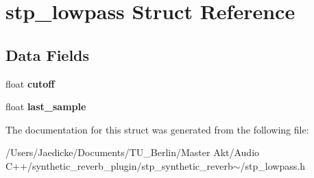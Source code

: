 \hypertarget{structstp__lowpass}{}\section{stp\+\_\+lowpass Struct Reference}
\label{structstp__lowpass}
\subsection*{Data Fields}
\begin{DoxyCompactItemize}
\item 
\mbox{\label{structstp__lowpass_a49d2acef157bfcfac3e09931076cd739}} 
float {\bfseries cutoff}
\item 
\mbox{\label{structstp__lowpass_aff19710c26a6a5ac1d3b157c56bb24e8}} 
float {\bfseries last\+\_\+sample}
\end{DoxyCompactItemize}


The documentation for this struct was generated from the following file\+:\begin{DoxyCompactItemize}
\item 
/\+Users/\+Jaedicke/\+Documents/\+T\+U\+\_\+\+Berlin/\+Master Akt/\+Audio C++/synthetic\+\_\+reverb\+\_\+plugin/stp\+\_\+synthetic\+\_\+reverb$\sim$/stp\+\_\+lowpass.\+h\end{DoxyCompactItemize}
